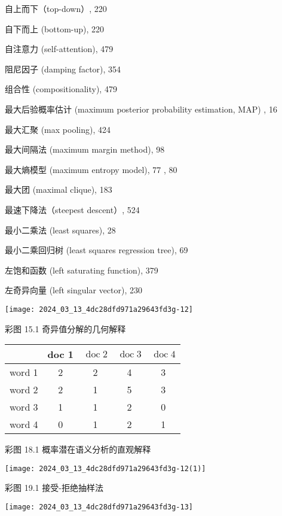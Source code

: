 \documentclass[10pt]{article}
\begin{document}
自上而下（top-down）, 220

自下而上 (bottom-up), 220

自注意力 (self-attention), 479

阻尼因子 (damping factor), 354

组合性 (compositionality), 479

最大后验概率估计 (maximum posterior probability estimation, MAP) , 16

最大汇聚 (max pooling), 424

最大间隔法 (maximum margin method), 98

最大熵模型 (maximum entropy model), 77 , 80

最大团 (maximal clique), 183

最速下降法（steepest descent）, 524

最小二乘法 (least squares), 28

最小二乘回归树 (least squares regression tree), 69

左饱和函数 (left saturating function), 379

左奇异向量 (left singular vector), 230

\begin{center}
\texttt{[image: 2024\_03\_13\_4dc28dfd971a29643fd3g-12]}
\end{center}

彩图 15.1 奇异值分解的几何解释

\begin{center}
\begin{tabular}{|c|c|c|c|c|}
\hline
 & doc 1 & $\operatorname{doc} 2$ & $\operatorname{doc} 3$ & $\operatorname{doc} 4$ \\
\hline
word 1 & 2 & 2 & 4 & 3 \\
\hline
word 2 & 2 & 1 & 5 & 3 \\
\hline
word 3 & 1 & 1 & 2 & 0 \\
\hline
word 4 & 0 & 1 & 2 & 1 \\
\hline
\end{tabular}
\end{center}

彩图 18.1 概率潜在语义分析的直观解释

\begin{center}
\texttt{[image: 2024\_03\_13\_4dc28dfd971a29643fd3g-12(1)]}
\end{center}

彩图 19.1 接受-拒绝抽样法

\begin{center}
\texttt{[image: 2024\_03\_13\_4dc28dfd971a29643fd3g-13]}
\end{center}
\end{document}
